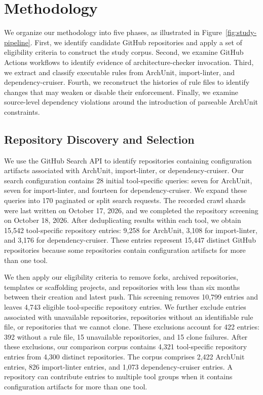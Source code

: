 \section{Methodology}\label{sec:study_design}



We organize our methodology into five phases, as illustrated in
Figure~\ref{fig:study-pipeline}. First, we identify candidate GitHub
repositories and apply a set of eligibility criteria to construct the
study corpus. Second, we examine GitHub Actions workflows to identify
evidence of architecture-checker invocation. Third, we extract and
classify executable rules from ArchUnit, import-linter, and
dependency-cruiser. Fourth, we reconstruct the histories of rule files
to identify changes that may weaken or disable their enforcement.
Finally, we examine source-level dependency violations around the
introduction of parseable ArchUnit constraints.

\subsection{Repository Discovery and Selection}

We use the GitHub Search API to identify repositories containing
configuration artifacts associated with ArchUnit, import-linter, or
dependency-cruiser. Our search configuration contains 28 initial
tool-specific queries: seven for ArchUnit, seven for import-linter,
and fourteen for dependency-cruiser. We expand these queries into
170 paginated or split search requests. The recorded crawl shards
were last written on October 17, 2026, and we completed the
repository screening on October 18, 2026. After deduplicating results within each tool, we obtain 15,542
tool-specific repository entries: 9,258 for ArchUnit, 3,108 for
import-linter, and 3,176 for dependency-cruiser. These entries
represent 15,447 distinct GitHub repositories because some
repositories contain configuration artifacts for more than one tool.

We then apply our eligibility criteria to remove forks, archived
repositories, templates or scaffolding projects, and repositories
with less than six months between their creation and latest push.
This screening removes 10,799 entries and leaves 4,743 eligible
tool-specific repository entries. We further exclude entries
associated with unavailable repositories, repositories without an
identifiable rule file, or repositories that we cannot clone.
These exclusions account for 422 entries: 392 without a rule file,
15 unavailable repositories, and 15 clone failures. After these exclusions, our comparison corpus contains 4,321
tool-specific repository entries from 4,300 distinct repositories.
The corpus comprises 2,422 ArchUnit entries, 826 import-linter
entries, and 1,073 dependency-cruiser entries. A repository can
contribute entries to multiple tool groups when it contains
configuration artifacts for more than one tool.

